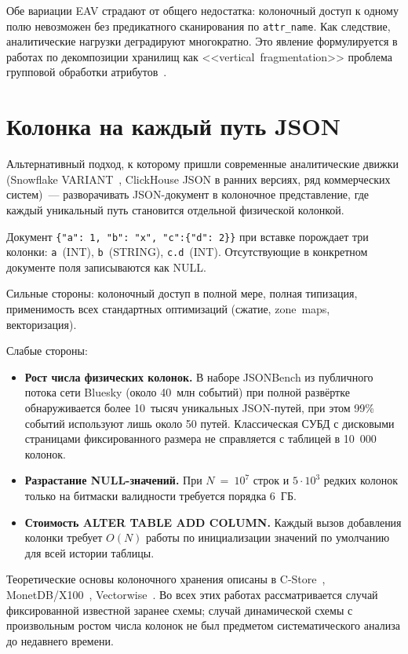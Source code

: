 Обе вариации EAV страдают от общего недостатка: колоночный доступ к
одному полю невозможен без предикатного сканирования по
\texttt{attr\_name}. Как следствие, аналитические нагрузки
деградируют многократно. Это явление формулируется в работах по
декомпозиции хранилищ как <<vertical~fragmentation>> проблема
групповой обработки атрибутов~\cite{copeland1985}.

\section{Колонка на каждый путь JSON}

Альтернативный подход, к которому пришли современные аналитические
движки (Snowflake VARIANT~\cite{snowflake-variant}, ClickHouse JSON
в ранних версиях, ряд коммерческих систем)~--- разворачивать
JSON-документ в колоночное представление, где каждый уникальный
путь становится отдельной физической колонкой.

Документ \texttt{\{"a":~1, "b":~"x", "c":\{"d":~2\}\}} при вставке
порождает три колонки: \texttt{a}~(INT), \texttt{b}~(STRING),
\texttt{c.d}~(INT). Отсутствующие в конкретном документе поля
записываются как NULL.

Сильные стороны: колоночный доступ в полной мере, полная типизация,
применимость всех стандартных оптимизаций (сжатие, zone~maps,
векторизация).

Слабые стороны:

\begin{itemize}
    \item \textbf{Рост числа физических колонок.} В наборе JSONBench
    из публичного потока сети Bluesky (около 40~млн событий) при
    полной развёртке обнаруживается более 10~тысяч уникальных
    JSON-путей, при этом 99\% событий используют лишь около 50
    путей. Классическая СУБД с дисковыми страницами фиксированного
    размера не справляется с таблицей в 10~000 колонок.
    \item \textbf{Разрастание NULL-значений.} При $N~=~10^7$ строк и
    $5\cdot 10^3$ редких колонок только на битмаски валидности
    требуется порядка 6~ГБ.
    \item \textbf{Стоимость ALTER TABLE ADD COLUMN.} Каждый вызов
    добавления колонки требует $O(N)$ работы по инициализации
    значений по умолчанию для всей истории таблицы.
\end{itemize}

Теоретические основы колоночного хранения описаны в
C-Store~\cite{cstore}, MonetDB/X100~\cite{monetdb-x100},
Vectorwise~\cite{vectorwise}. Во всех этих работах рассматривается
случай фиксированной известной заранее схемы; случай динамической
схемы с произвольным ростом числа колонок не был предметом
систематического анализа до недавнего времени.

